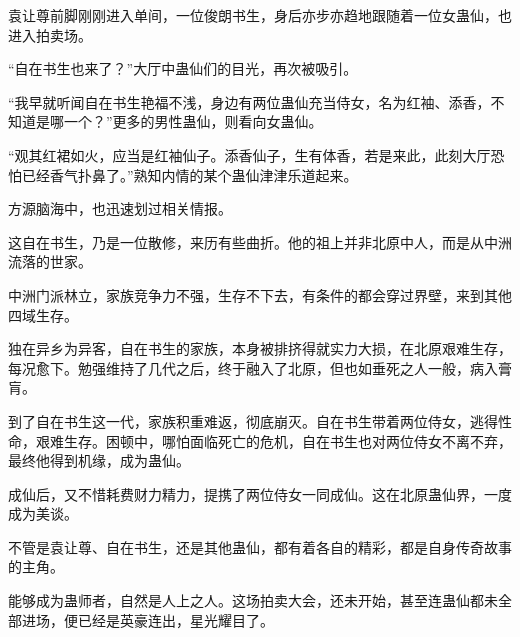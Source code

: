 \begin{this_body}
袁让尊前脚刚刚进入单间，一位俊朗书生，身后亦步亦趋地跟随着一位女蛊仙，也进入拍卖场。

“自在书生也来了？”大厅中蛊仙们的目光，再次被吸引。

“我早就听闻自在书生艳福不浅，身边有两位蛊仙充当侍女，名为红袖、添香，不知道是哪一个？”更多的男性蛊仙，则看向女蛊仙。

“观其红裙如火，应当是红袖仙子。添香仙子，生有体香，若是来此，此刻大厅恐怕已经香气扑鼻了。”熟知内情的某个蛊仙津津乐道起来。

方源脑海中，也迅速划过相关情报。

这自在书生，乃是一位散修，来历有些曲折。他的祖上并非北原中人，而是从中洲流落的世家。

中洲门派林立，家族竞争力不强，生存不下去，有条件的都会穿过界壁，来到其他四域生存。

独在异乡为异客，自在书生的家族，本身被排挤得就实力大损，在北原艰难生存，每况愈下。勉强维持了几代之后，终于融入了北原，但也如垂死之人一般，病入膏肓。

到了自在书生这一代，家族积重难返，彻底崩灭。自在书生带着两位侍女，逃得性命，艰难生存。困顿中，哪怕面临死亡的危机，自在书生也对两位侍女不离不弃，最终他得到机缘，成为蛊仙。

成仙后，又不惜耗费财力精力，提携了两位侍女一同成仙。这在北原蛊仙界，一度成为美谈。

不管是袁让尊、自在书生，还是其他蛊仙，都有着各自的精彩，都是自身传奇故事的主角。

能够成为蛊师者，自然是人上之人。这场拍卖大会，还未开始，甚至连蛊仙都未全部进场，便已经是英豪连出，星光耀目了。

\end{this_body}

